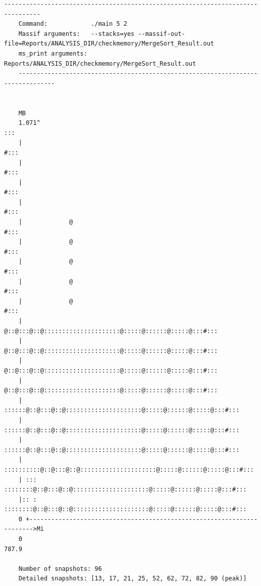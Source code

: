 \begin{lstlisting}[style=StyleResult, language=Result, basicstyle=\fontsize{9}{10}\selectfont\ttfamily, caption={Kiểm tra sử dụng bộ nhớ khi sử dụng MergeSort.}]
	--------------------------------------------------------------------------------
	Command:            ./main 5 2
	Massif arguments:   --stacks=yes --massif-out-file=Reports/ANALYSIS_DIR/checkmemory/MergeSort_Result.out
	ms_print arguments: Reports/ANALYSIS_DIR/checkmemory/MergeSort_Result.out
	--------------------------------------------------------------------------------
	
	
	MB
	1.071^                                                                :::
	|                                                                    #:::
	|                                                                    #:::
	|                                                                    #:::
	|                                                                    #:::
	|             @                                                      #:::
	|             @                                                      #:::
	|             @                                                      #:::
	|             @                                                      #:::
	|             @                                                      #:::
	|             @::@:::@::@:::::::::::::::::::::@:::::@::::::@:::::@:::#:::
	|             @::@:::@::@:::::::::::::::::::::@:::::@::::::@:::::@:::#:::
	|             @::@:::@::@:::::::::::::::::::::@:::::@::::::@:::::@:::#:::
	|             @::@:::@::@:::::::::::::::::::::@:::::@::::::@:::::@:::#:::
	|       ::::::@::@:::@::@:::::::::::::::::::::@:::::@::::::@:::::@:::#:::
	|       ::::::@::@:::@::@:::::::::::::::::::::@:::::@::::::@:::::@:::#:::
	|       ::::::@::@:::@::@:::::::::::::::::::::@:::::@::::::@:::::@:::#:::
	|   ::::::::::@::@:::@::@:::::::::::::::::::::@:::::@::::::@:::::@:::#:::
	| ::: ::::::::@::@:::@::@:::::::::::::::::::::@:::::@::::::@:::::@:::#:::
	|:: : ::::::::@::@:::@::@:::::::::::::::::::::@:::::@::::::@:::::@:::#:::
	0 +----------------------------------------------------------------------->Mi
	0                                                                   787.9
	
	Number of snapshots: 96
	Detailed snapshots: [13, 17, 21, 25, 52, 62, 72, 82, 90 (peak)]
\end{lstlisting}

